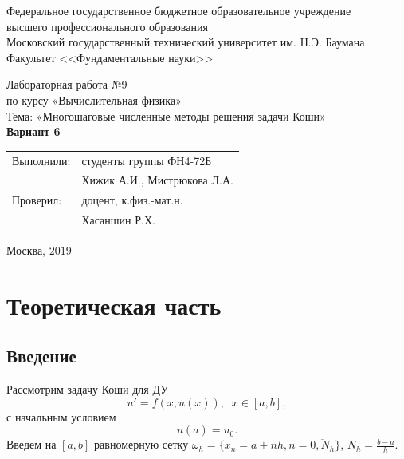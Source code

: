 \documentclass[
11pt,
master, %
subf, %
href, %
colorlinks=true, %
times, %
]{disser}
\begin{document}
\pagestyle{empty}
\begin{center}

\noindent  Федеральное государственное бюджетное образовательное учреждение\\
высшего профессионального образования\\

Московский государственный технический университет им. Н.Э. Баумана \\
Факультет <<Фундаментальные науки>>\bigskip\\

\vfill

Лабораторная работа №9\\
по курсу «Вычислительная физика»\\
Тема: «Многошаговые численные методы решения задачи Коши»\\
\textbf{Вариант 6}\\


\vfill
\vfill
\begin{flushright}
\begin{tabular}{ll}
Выполнили: & студенты группы ФН4-72Б     \\
           & Хижик А.И., Мистрюкова Л.А. \\
Проверил:  & доцент, к.физ.-мат.н.       \\
           & Хасаншин Р.Х.
\end{tabular}
\end{flushright}
\vfill
\begin{center}
Москва, $2019$
\end{center}

\end{center}
\pagebreak


\pagestyle{plain}
\tableofcontents

\section{Теоретическая часть}
\subsection{Введение}
Рассмотрим задачу Коши для ДУ
\begin{equation}\label{eq1}
  u' = f(x,u(x)),\;\;x\in [a,b],
\end{equation}
с начальным условием
\begin{equation}\label{eq2}
  u(a) = u_0.
\end{equation}
Введем на $[a,b]$ равномерную сетку $\omega_h = \{x_n = a + nh, n = \overline{0, N_h}\}$, $N_h = \frac{b-a}{h}$.
\end{document}
